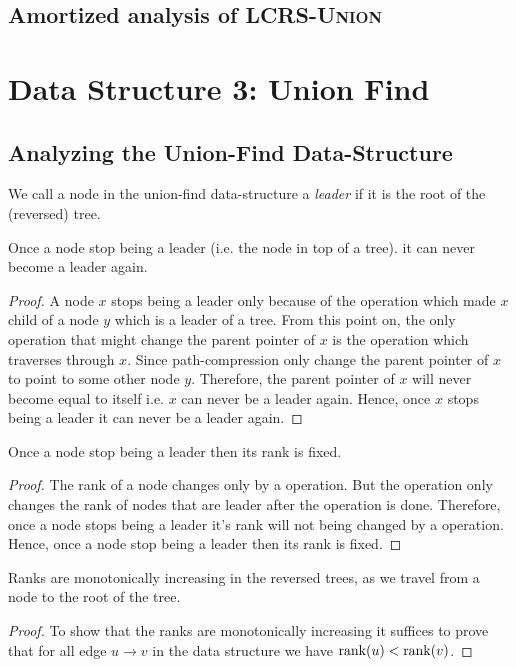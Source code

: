 \subsection{Amortized analysis of \textsc{LCRS-Union}}

\section{Data Structure 3: Union Find}
\subsection{Analyzing the Union-Find Data-Structure}
We call a node in the union-find data-structure a \textit{leader} if it is the root of the (reversed) tree.
\begin{lemma}{}{}
	Once a node stop being a {leader} (i.e. the node in top of a tree). it can never become a leader again.
\end{lemma}
\begin{proof}
	A node $x$ stops being a {leader} only because of the  operation which made $x$ child of a node $y$ which is a {leader} of a tree. From this point on, the only operation that might change the parent pointer of $x$ is the  operation which traverses through $x$. Since path-compression only change the parent pointer of $x$ to point to some other node $y$. Therefore, the parent pointer of $x$ will never become equal to itself i.e. $x$ can never be a {leader} again. Hence, once $x$ stops being a {leader} it can never be a {leader} again.
\end{proof}
\begin{lemma}{}{}
	Once a node stop being a leader then its rank is fixed.
\end{lemma}
\begin{proof}
	The rank of a node changes only by a  operation. But the  operation only changes the rank of nodes that are {leader} after the operation is done. Therefore, once a node stops being a {leader} it's rank will not being changed by a  operation. Hence, once a node stop being a leader then its rank is fixed.
\end{proof}
\begin{lemma}{}{}
	Ranks are monotonically increasing in the reversed trees, as we travel from a node to
	the root of the tree.
\end{lemma}
\begin{proof}
	To show that the ranks are monotonically increasing  it suffices to prove that for all edge $u\to v$ in the data structure we have $\operatorname{rank}(u)<\operatorname{rank}(v)$.
\end{proof}

